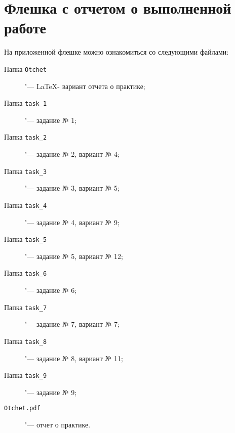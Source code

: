
\section{Флешка с отчетом о выполненной работе}\label{app:Flash}
На приложенной флешке можно ознакомиться со следующими файлами:
\begin{description}
\item[Папка \texttt{Otchet}] "---   \LaTeX- вариант отчета о практике;
\item[Папка \texttt{task\_1}] "--- задание № 1;
\item[Папка \texttt{task\_2}] "---  задание № 2, вариант № 4;
\item[Папка \texttt{task\_3}] "--- задание № 3, вариант № 5;
\item[Папка \texttt{task\_4}] "--- задание № 4, вариант № 9;
\item[Папка \texttt{task\_5}] "--- задание № 5, вариант № 12;
\item[Папка \texttt{task\_6}] "--- задание № 6;
\item[Папка \texttt{task\_7}] "--- задание № 7, вариант № 7;
\item[Папка \texttt{task\_8}] "--- задание № 8, вариант № 11;
\item[Папка \texttt{task\_9}] "--- задание № 9;
\item[\texttt{Otchet.pdf}] "--- отчет о практике.
\end{description}